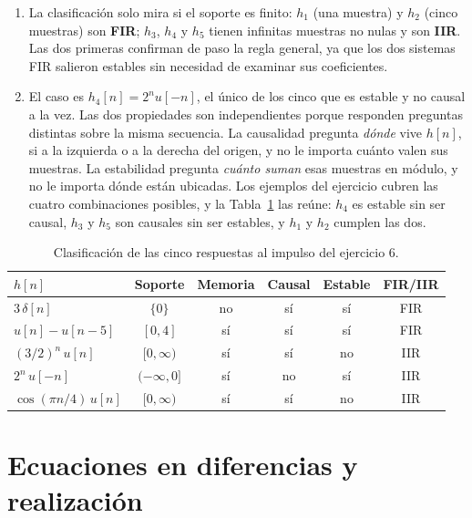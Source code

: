 \documentclass[10pt,a4paper]{article}
\newcommand{\tema}[1]{%
  \bigskip
  \section*{#1}
  \vspace{-0.6em}
}
\begin{document}
\begin{enumerate}
		\item La clasificación solo mira si el soporte es finito:
		$h_1$ (una muestra) y $h_2$ (cinco muestras) son \textbf{FIR}; $h_3$, $h_4$ y $h_5$
		tienen infinitas muestras no nulas y son \textbf{IIR}. Las dos primeras confirman de
		paso la regla general, ya que los dos sistemas FIR salieron estables sin necesidad
		de examinar sus coeficientes.

		\item El caso es $h_4[n]=2^n u[-n]$, el único de los
		cinco que es estable y no causal a la vez. Las dos propiedades son independientes porque
		responden preguntas distintas sobre la misma secuencia. La causalidad pregunta
		\emph{dónde} vive $h[n]$, si a la izquierda o a la derecha del origen, y no le
		importa cuánto valen sus muestras. La estabilidad pregunta \emph{cuánto suman} esas
		muestras en módulo, y no le importa dónde están ubicadas. Los ejemplos del ejercicio
		cubren las cuatro combinaciones posibles, y la Tabla~\ref{tab:sol_ej6} las reúne:
		$h_4$ es estable sin ser causal, $h_3$ y $h_5$ son causales sin ser estables, y
		$h_1$ y $h_2$ cumplen las dos.
	\end{enumerate}

	\begin{table}[H]
		\centering
		\caption{Clasificación de las cinco respuestas al impulso del ejercicio 6.}
		\label{tab:sol_ej6}
		\begin{tabular}{lccccc}
			\toprule
			$h[n]$ & Soporte & Memoria & Causal & Estable & FIR/IIR \\
			\midrule
			$3\,\delta[n]$                 & $\{0\}$           & no & sí & sí & FIR \\
			$u[n]-u[n-5]$                  & $[0,4]$           & sí & sí & sí & FIR \\
			$(3/2)^n\,u[n]$                & $[0,\infty)$      & sí & sí & no & IIR \\
			$2^n\,u[-n]$                   & $(-\infty,0]$     & sí & no & sí & IIR \\
			$\cos(\pi n/4)\,u[n]$          & $[0,\infty)$      & sí & sí & no & IIR \\
			\bottomrule
		\end{tabular}
	\end{table}

	\tema{Ecuaciones en diferencias y realización}
\end{document}
